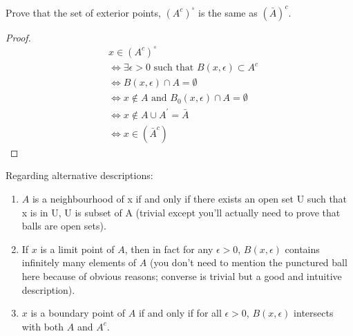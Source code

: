 \begin{prbm}
Prove that the set of exterior points, $(A^c)^\circ$ is the same as $(\bar{A})^c$.
\end{prbm}

\begin{proof}
\begin{align*}
&x \in (A^c)^\circ \\
&\iff \exists \epsilon>0 \text{ such that } B(x,\epsilon) \subset A^c \\
&\iff B(x,\epsilon) \cap A = \emptyset \\
&\iff x \notin A \text{ and } B_0(x,\epsilon) \cap A=\emptyset \\
&\iff x \notin A \cup A^\prime = \bar A \\
&\iff x \in (\bar A^c)
\end{align*}
\end{proof}

\begin{prbm}
Regarding alternative descriptions:
\begin{enumerate}
\item $A$ is a neighbourhood of x if and only if there exists an open set U such that x is in U, U is subset of A (trivial except you'll actually need to prove that balls are open sets).
\item If $x$ is a limit point of $A$, then in fact for any $\epsilon>0$, $B(x,\epsilon)$ contains infinitely many elements of $A$ (you don't need to mention the punctured ball here because of obvious reasons; converse is trivial but a good and intuitive description).
\item $x$ is a boundary point of $A$ if and only if for all $\epsilon>0$, $B(x,\epsilon)$ intersects with both $A$ and $A^c$.
\end{enumerate}
\end{prbm}

